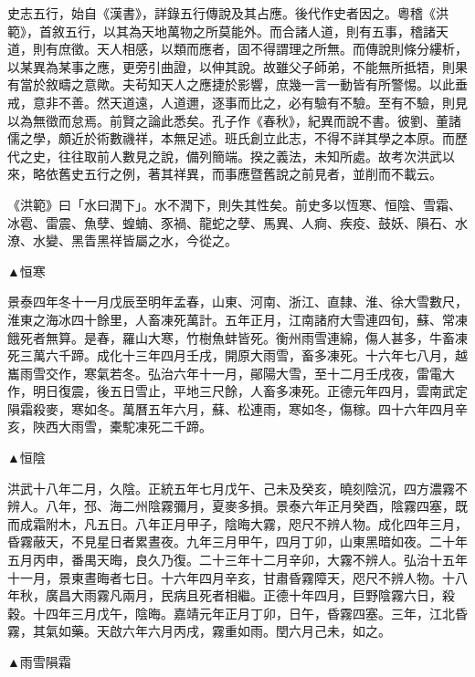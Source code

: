 
\begin{pinyinscope}
史志五行，始自《漢書》，詳錄五行傳說及其占應。後代作史者因之。粵稽《洪範》，首敘五行，以其為天地萬物之所莫能外。而合諸人道，則有五事，稽諸天道，則有庶徵。天人相感，以類而應者，固不得謂理之所無。而傳說則條分縷析，以某異為某事之應，更旁引曲證，以伸其說。故雖父子師弟，不能無所抵牾，則果有當於敘疇之意歟。夫茍知天人之應捷於影響，庶幾一言一動皆有所警惕。以此垂戒，意非不善。然天道遠，人道邇，逐事而比之，必有驗有不驗。至有不驗，則見以為無徵而怠焉。前賢之論此悉矣。孔子作《春秋》，紀異而說不書。彼劉、董諸儒之學，頗近於術數禨祥，本無足述。班氏創立此志，不得不詳其學之本原。而歷代之史，往往取前人數見之說，備列簡端。揆之義法，未知所處。故考次洪武以來，略依舊史五行之例，著其祥異，而事應暨舊說之前見者，並削而不載云。

《洪範》曰「水曰潤下」。水不潤下，則失其性矣。前史多以恆寒、恒陰、雪霜、冰雹、雷震、魚孽、蝗蝻、豕禍、龍蛇之孽、馬異、人痾、疾疫、鼓妖、隕石、水潦、水變、黑眚黑祥皆屬之水，今從之。

▲恒寒

景泰四年冬十一月戊辰至明年孟春，山東、河南、浙江、直隸、淮、徐大雪數尺，淮東之海冰四十餘里，人畜凍死萬計。五年正月，江南諸府大雪連四旬，蘇、常凍餓死者無算。是春，羅山大寒，竹樹魚蚌皆死。衡州雨雪連綿，傷人甚多，牛畜凍死三萬六千蹄。成化十三年四月壬戌，開原大雨雪，畜多凍死。十六年七八月，越巂雨雪交作，寒氣若冬。弘治六年十一月，鄖陽大雪，至十二月壬戌夜，雷電大作，明日復震，後五日雪止，平地三尺餘，人畜多凍死。正德元年四月，雲南武定隕霜殺麥，寒如冬。萬曆五年六月，蘇、松連雨，寒如冬，傷稼。四十六年四月辛亥，陜西大雨雪，橐駝凍死二千蹄。

▲恒陰

洪武十八年二月，久陰。正統五年七月戊午、己未及癸亥，曉刻陰沉，四方濃霧不辨人。八年，邳、海二州陰霧彌月，夏麥多損。景泰六年正月癸酉，陰霧四塞，既而成霜附木，凡五日。八年正月甲子，陰晦大霧，咫尺不辨人物。成化四年三月，昏霧蔽天，不見星日者累晝夜。九年三月甲午，四月丁卯，山東黑暗如夜。二十年五月丙申，番禺天晦，良久乃復。二十三年十二月辛卯，大霧不辨人。弘治十五年十一月，景東晝晦者七日。十六年四月辛亥，甘肅昏霧障天，咫尺不辨人物。十八年秋，廣昌大雨霧凡兩月，民病且死者相繼。正德十年四月，巨野陰霧六日，殺穀。十四年三月戊午，陰晦。嘉靖元年正月丁卯，日午，昏霧四塞。三年，江北昏霧，其氣如藥。天啟六年六月丙戌，霧重如雨。閏六月己未，如之。

▲雨雪隕霜


\end{pinyinscope}
